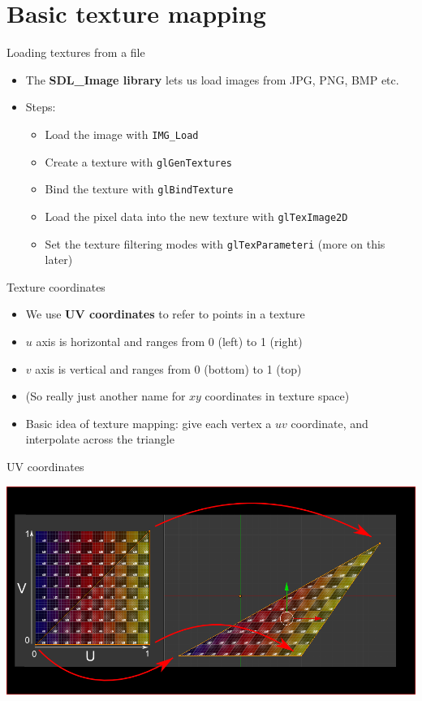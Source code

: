 \part{Basic texture mapping}
\frame{\partpage}

\begin{frame}{Loading textures from a file}
	\begin{itemize}
		\pause\item The \textbf{SDL\_Image library} lets us load images from JPG, PNG, BMP etc.
		\pause\item Steps:
			\begin{itemize}
				\pause\item Load the image with \lstinline{IMG_Load}
				\pause\item Create a texture with \lstinline{glGenTextures}
				\pause\item Bind the texture with \lstinline{glBindTexture}
				\pause\item Load the pixel data into the new texture with \lstinline{glTexImage2D}
				\pause\item Set the texture filtering modes with \lstinline{glTexParameteri} (more on this later)
			\end{itemize}
	\end{itemize}
\end{frame}

\begin{frame}{Texture coordinates}
	\begin{itemize}
		\pause\item We use \textbf{UV coordinates} to refer to points in a texture
		\pause\item $u$ axis is horizontal and ranges from 0 (left) to 1 (right)
		\pause\item $v$ axis is vertical and ranges from 0 (bottom) to 1 (top)
		\pause\item (So really just another name for $xy$ coordinates in texture space)
		\pause\item Basic idea of texture mapping: give each vertex a $uv$ coordinate, and interpolate across the triangle
	\end{itemize}
\end{frame}

\begin{frame}{UV coordinates}
	\begin{center}
		\includegraphics[width=\textwidth]{uv}
	\end{center}
\end{frame}

